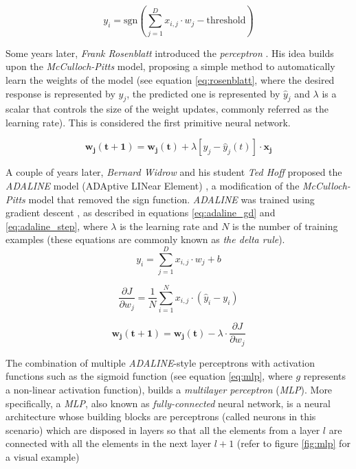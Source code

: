 \begin{equation}
	\label{eq:mcpitts}
	y_i = \mathrm{sgn}\left(\sum_{j=1}^{D} x_{i,j} \cdot w_{j} - \mathrm{threshold}\right)
\end{equation}

Some years later, \textit{Frank Rosenblatt} introduced the \textit{perceptron} \autocite{Rosenblatt58}. His idea builds upon the \textit{McCulloch-Pitts} model, proposing a simple method to automatically learn the weights of the model (see equation \ref{eq:rosenblatt}, where the desired response is represented by $y_j$, the predicted one is represented by $\hat{y}_j$ and $\lambda$ is a scalar that controls the size of the weight updates, commonly referred as the learning rate). This is considered the first primitive neural network.

\begin{equation}
\label{eq:rosenblatt}
\mathbf{w_j(t+1)} = \mathbf{w_j(t)} + \lambda [ y_j-\hat{y}_j(t) ] \cdot \mathbf{x_j}
\end{equation}

 A couple of years later, \textit{Bernard Widrow} and his student \textit{Ted Hoff} proposed the \textit{ADALINE} model (ADAptive LINear Element) \autocite{widrow1960}, a modification of the \textit{McCulloch-Pitts} model that removed the sign function. \textit{ADALINE} was trained using gradient descent \autocite{fredric2000}, as described in equations \ref{eq:adaline_gd} and \ref{eq:adaline_step}, where $\lambda$ is the learning rate and $N$ is the number of training examples (these equations are commonly known as \textit{the delta rule}).
\begin{equation}
\label{eq:adaline_fp}
y_i = \sum_{j=1}^{D} x_{i,j} \cdot w_{j} + b
\end{equation}

\begin{equation}
\label{eq:adaline_gd}
\frac{\partial J}{\partial{w_j}} = \frac{1}{N} \sum_{i=1}^{N} x_{i,j} \cdot(\hat{y}_i - y_i)
\end{equation}

\begin{equation}
\label{eq:adaline_step}
\mathbf{w_j(t+1)} = \mathbf{w_j(t)} - \lambda \cdot \frac{\partial J}{\partial {w_j}}
\end{equation}


 The combination of multiple \textit{ADALINE}-style perceptrons with activation functions such as the sigmoid function (see equation \ref{eq:mlp}, where $g$ represents a non-linear activation function), builds a \textit{multilayer perceptron} (\textit{MLP}). More specifically, a \textit{MLP}, also known as \textit{fully-connected} neural network, is a neural architecture whose building blocks are perceptrons (called neurons in this scenario) which are disposed in layers so that all the elements from a layer $l$ are connected with all the elements in the next layer $l+1$ (refer to figure \ref{fig:mlp} for a visual example)


